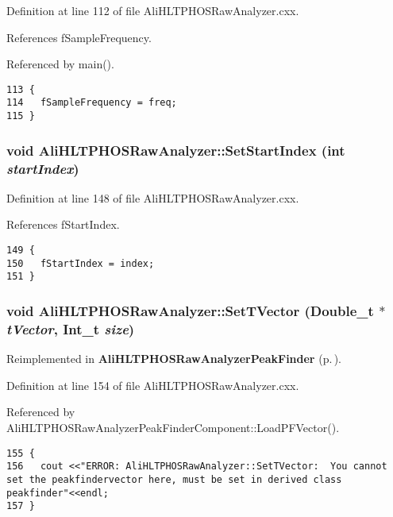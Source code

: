 Definition at line 112 of file Ali\-HLTPHOSRaw\-Analyzer.cxx.

References f\-Sample\-Frequency.

Referenced by main().

\footnotesize\begin{verbatim}113 {
114   fSampleFrequency = freq;
115 }
\end{verbatim}\normalsize 


\subsubsection{\setlength{\rightskip}{0pt plus 5cm}void Ali\-HLTPHOSRaw\-Analyzer::Set\-Start\-Index (int {\em start\-Index})}\label{classAliHLTPHOSRawAnalyzer_a12}




Definition at line 148 of file Ali\-HLTPHOSRaw\-Analyzer.cxx.

References f\-Start\-Index.

\footnotesize\begin{verbatim}149 {
150   fStartIndex = index;
151 }
\end{verbatim}\normalsize 


\subsubsection{\setlength{\rightskip}{0pt plus 5cm}void Ali\-HLTPHOSRaw\-Analyzer::Set\-TVector (Double\_\-t $\ast$ {\em t\-Vector}, Int\_\-t {\em size})\hspace{0.3cm}{\tt  [virtual]}}\label{classAliHLTPHOSRawAnalyzer_a15}




Reimplemented in {\bf Ali\-HLTPHOSRaw\-Analyzer\-Peak\-Finder} {\rm (p.\,\pageref{classAliHLTPHOSRawAnalyzerPeakFinder_a4})}.

Definition at line 154 of file Ali\-HLTPHOSRaw\-Analyzer.cxx.

Referenced by Ali\-HLTPHOSRaw\-Analyzer\-Peak\-Finder\-Component::Load\-PFVector().

\footnotesize\begin{verbatim}155 {
156   cout <<"ERROR: AliHLTPHOSRawAnalyzer::SetTVector:  You cannot set the peakfindervector here, must be set in derived class peakfinder"<<endl;
157 }
\end{verbatim}\normalsize 




